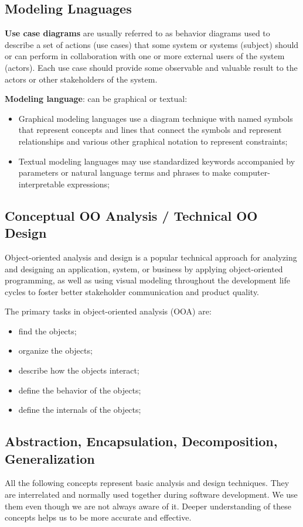 \documentclass{article}
\begin{document}
		\subsection{Modeling Lnaguages}
			\textbf{Use case diagrams} are usually referred to as behavior diagrams used to describe a set of actions (use cases) that some system or systems (subject) should or can perform in collaboration with one or more external users of the system (actors). Each use case should provide some observable and valuable result to the actors or other stakeholders of the system.

			\bigskip
			\textbf{Modeling language}: can be graphical or textual:
			\begin{itemize}
				\item Graphical modeling languages use a diagram technique with named symbols that represent concepts and lines that connect the symbols and represent relationships and various other graphical notation to represent constraints;
				\item Textual modeling languages may use standardized keywords accompanied by parameters or natural language terms and phrases to make computer-interpretable expressions;
			\end{itemize}

		\subsection{Conceptual OO Analysis / Technical OO Design}
			Object-oriented analysis and design is a popular technical approach for analyzing and designing an application, system, or business by applying object-oriented programming, as well as using visual modeling throughout the development life cycles to foster better stakeholder communication and product quality.

			The primary tasks in object-oriented analysis (OOA) are:
			\begin{itemize}
				\item find the objects;
				\item organize the objects;
				\item describe how the objects interact;
				\item define the behavior of the objects;
				\item define the internals of the objects;
			\end{itemize}

		\subsection{Abstraction, Encapsulation, Decomposition, Generalization}
			All the following concepts represent basic analysis and design techniques. They are interrelated and normally used together during software development. We use them even though we are not always aware of it. Deeper understanding of these concepts helps us to be more accurate and effective.
\end{document}
